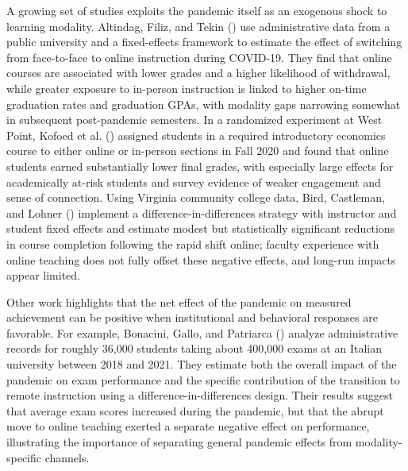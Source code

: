 \documentclass[
  12pt,
  letterpaper,
  DIV=11,
  numbers=noendperiod]{scrartcl}
\begin{document}
A growing set of studies exploits the pandemic itself as an exogenous
shock to learning modality. Altindag, Filiz, and Tekin
() use administrative data from a
public university and a fixed-effects framework to estimate the effect
of switching from face-to-face to online instruction during COVID-19.
They find that online courses are associated with lower grades and a
higher likelihood of withdrawal, while greater exposure to in-person
instruction is linked to higher on-time graduation rates and graduation
GPAs, with modality gaps narrowing somewhat in subsequent post-pandemic
semesters. In a randomized experiment at West Point, Kofoed et al.
() assigned students in a
required introductory economics course to either online or in-person
sections in Fall 2020 and found that online students earned
substantially lower final grades, with especially large effects for
academically at-risk students and survey evidence of weaker engagement
and sense of connection. Using Virginia community college data, Bird,
Castleman, and Lohner ()
implement a difference-in-differences strategy with instructor and
student fixed effects and estimate modest but statistically significant
reductions in course completion following the rapid shift online;
faculty experience with online teaching does not fully offset these
negative effects, and long-run impacts appear limited.

Other work highlights that the net effect of the pandemic on measured
achievement can be positive when institutional and behavioral responses
are favorable. For example, Bonacini, Gallo, and Patriarca
() analyze administrative
records for roughly 36,000 students taking about 400,000 exams at an
Italian university between 2018 and 2021. They estimate both the overall
impact of the pandemic on exam performance and the specific contribution
of the transition to remote instruction using a
difference-in-differences design. Their results suggest that average
exam scores increased during the pandemic, but that the abrupt move to
online teaching exerted a separate negative effect on performance,
illustrating the importance of separating general pandemic effects from
modality-specific channels.
\end{document}
